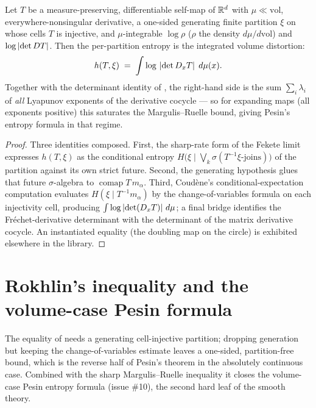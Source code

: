 \begin{theorem}\label{ksEntropyPartition_eq_integral_log_abs_det}
  \leanok
  Let \(T\) be a measure-preserving, differentiable self-map of \(\mathbb{R}^d\) with
  \(\mu\ll\mathrm{vol}\), everywhere-nonsingular derivative, a one-sided generating finite
  partition \(\xi\) on whose cells \(T\) is injective, and \(\mu\)-integrable \(\log\rho\)
  (\(\rho\) the density \(d\mu/d\mathrm{vol}\)) and \(\log\left\lvert \det DT \right\rvert\). Then the per-partition
  entropy is the integrated volume distortion:
  \[
    h(T,\xi) \;=\; \int \log\,\left\lvert \det D_xT \right\rvert\;d\mu(x).
  \]
  Together with the determinant identity of , the
  right-hand side is the sum \(\sum_i\lambda_i\) of \emph{all} Lyapunov exponents of the
  derivative cocycle --- so for expanding maps (all exponents positive) this saturates the
  Margulis--Ruelle bound, giving Pesin's entropy formula in that regime.
\end{theorem}
\begin{proof}\leanok
  Three identities composed. First, the sharp-rate form of the Fekete limit expresses
  \(h(T,\xi)\) as the conditional entropy \(H\bigl(\xi\mid\bigvee_k\sigma(T^{-1}\xi\text{-joins})\bigr)\)
  of the partition against its own strict future. Second, the generating hypothesis glues that
  future \(\sigma\)-algebra to \(\operatorname{comap}T\,m_\alpha\). Third, Coud\`ene's
  conditional-expectation computation evaluates \(H(\xi\mid T^{-1}m_\alpha)\) by the
  change-of-variables formula on each injectivity cell, producing
  \(\int\log\left\lvert \det(D_xT) \right\rvert\,d\mu\); a final bridge identifies the Fr\'echet-derivative
  determinant with the determinant of the matrix derivative cocycle. An instantiated equality
  (the doubling map on the circle) is exhibited elsewhere in the library.
\end{proof}

\section{Rokhlin's inequality and the volume-case Pesin formula}

The equality of  needs a generating cell-injective
partition; dropping generation but keeping the change-of-variables estimate leaves a one-sided,
partition-free bound, which is the reverse half of Pesin's theorem in the absolutely continuous
case. Combined with the sharp Margulis--Ruelle inequality it closes the volume-case
Pesin entropy formula (issue \#10), the second hard leaf of the smooth theory.

